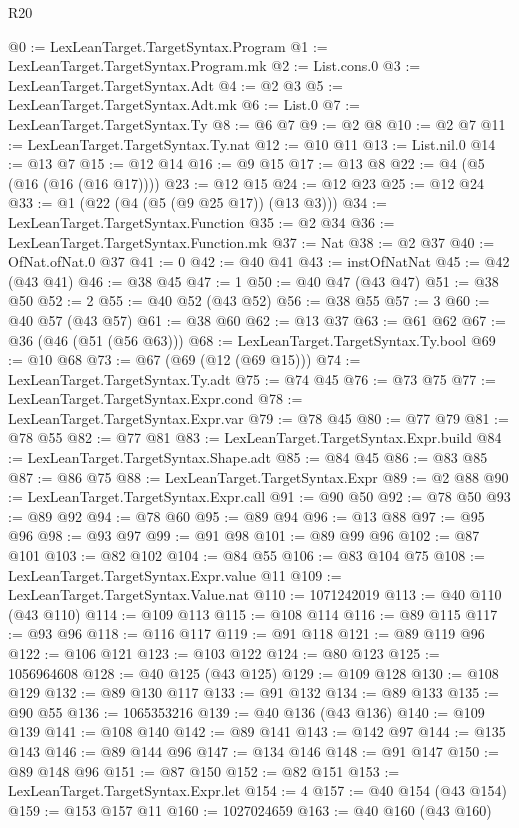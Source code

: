 \begin{lexlean}{R20}
\begin{coremodule}
@0 := LexLeanTarget.TargetSyntax.Program
@1 := LexLeanTarget.TargetSyntax.Program.mk
@2 := List.cons.{0}
@3 := LexLeanTarget.TargetSyntax.Adt
@4 := @2 @3
@5 := LexLeanTarget.TargetSyntax.Adt.mk
@6 := List.{0}
@7 := LexLeanTarget.TargetSyntax.Ty
@8 := @6 @7
@9 := @2 @8
@10 := @2 @7
@11 := LexLeanTarget.TargetSyntax.Ty.nat
@12 := @10 @11
@13 := List.nil.{0}
@14 := @13 @7
@15 := @12 @14
@16 := @9 @15
@17 := @13 @8
@22 := @4 (@5 (@16 (@16 (@16 @17))))
@23 := @12 @15
@24 := @12 @23
@25 := @12 @24
@33 := @1 (@22 (@4 (@5 (@9 @25 @17)) (@13 @3)))
@34 := LexLeanTarget.TargetSyntax.Function
@35 := @2 @34
@36 := LexLeanTarget.TargetSyntax.Function.mk
@37 := Nat
@38 := @2 @37
@40 := OfNat.ofNat.{0} @37
@41 := 0
@42 := @40 @41
@43 := instOfNatNat
@45 := @42 (@43 @41)
@46 := @38 @45
@47 := 1
@50 := @40 @47 (@43 @47)
@51 := @38 @50
@52 := 2
@55 := @40 @52 (@43 @52)
@56 := @38 @55
@57 := 3
@60 := @40 @57 (@43 @57)
@61 := @38 @60
@62 := @13 @37
@63 := @61 @62
@67 := @36 (@46 (@51 (@56 @63)))
@68 := LexLeanTarget.TargetSyntax.Ty.bool
@69 := @10 @68
@73 := @67 (@69 (@12 (@69 @15)))
@74 := LexLeanTarget.TargetSyntax.Ty.adt
@75 := @74 @45
@76 := @73 @75
@77 := LexLeanTarget.TargetSyntax.Expr.cond
@78 := LexLeanTarget.TargetSyntax.Expr.var
@79 := @78 @45
@80 := @77 @79
@81 := @78 @55
@82 := @77 @81
@83 := LexLeanTarget.TargetSyntax.Expr.build
@84 := LexLeanTarget.TargetSyntax.Shape.adt
@85 := @84 @45
@86 := @83 @85
@87 := @86 @75
@88 := LexLeanTarget.TargetSyntax.Expr
@89 := @2 @88
@90 := LexLeanTarget.TargetSyntax.Expr.call
@91 := @90 @50
@92 := @78 @50
@93 := @89 @92
@94 := @78 @60
@95 := @89 @94
@96 := @13 @88
@97 := @95 @96
@98 := @93 @97
@99 := @91 @98
@101 := @89 @99 @96
@102 := @87 @101
@103 := @82 @102
@104 := @84 @55
@106 := @83 @104 @75
@108 := LexLeanTarget.TargetSyntax.Expr.value @11
@109 := LexLeanTarget.TargetSyntax.Value.nat
@110 := 1071242019
@113 := @40 @110 (@43 @110)
@114 := @109 @113
@115 := @108 @114
@116 := @89 @115
@117 := @93 @96
@118 := @116 @117
@119 := @91 @118
@121 := @89 @119 @96
@122 := @106 @121
@123 := @103 @122
@124 := @80 @123
@125 := 1056964608
@128 := @40 @125 (@43 @125)
@129 := @109 @128
@130 := @108 @129
@132 := @89 @130 @117
@133 := @91 @132
@134 := @89 @133
@135 := @90 @55
@136 := 1065353216
@139 := @40 @136 (@43 @136)
@140 := @109 @139
@141 := @108 @140
@142 := @89 @141
@143 := @142 @97
@144 := @135 @143
@146 := @89 @144 @96
@147 := @134 @146
@148 := @91 @147
@150 := @89 @148 @96
@151 := @87 @150
@152 := @82 @151
@153 := LexLeanTarget.TargetSyntax.Expr.let
@154 := 4
@157 := @40 @154 (@43 @154)
@159 := @153 @157 @11
@160 := 1027024659
@163 := @40 @160 (@43 @160)

\end{coremodule}
\end{lexlean}
